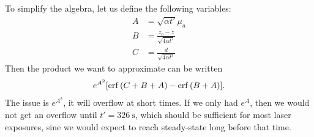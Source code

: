 \documentclass[]{article}
\begin{document}
To simplify the algebra, let us define the following variables:
\begin{align*}
	A &= \sqrt{\alpha t'} \mu_a \\
	B &= \frac{z_0 - z}{\sqrt{4\alpha t'}} \\
	C &= \frac{d}{\sqrt{4\alpha t'}} 
\end{align*}
Then the product we want to approximate can be written
\begin{align*}
e^{A^2} \qty[
\erf\qty(C + B + A ) - \erf\qty(B + A)
].
\end{align*}
The issue is $e^{A^2}$, it will overflow at short times. If we only had $e^A$, then we would not get an overflow until $t' = \SI{326}{\second}$, which should be sufficient for most laser exposures, sine we would expect to reach steady-state long before that time.
\end{document}
